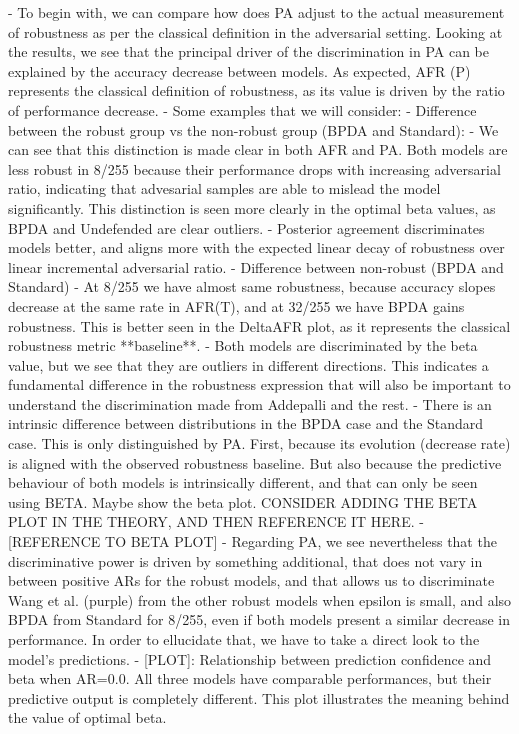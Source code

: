 - To begin with, we can compare how does PA adjust to the actual measurement of robustness as per the classical definition in the adversarial setting. Looking at the results, we see that the principal driver of the discrimination in PA can be explained by the accuracy decrease between models. As expected, AFR (P) represents the classical definition of robustness, as its value is driven by the ratio of performance decrease.
- Some examples that we will consider:
    - Difference between the robust group vs the non-robust group (BPDA and Standard):
        - We can see that this distinction is made clear in both AFR and PA. Both models are less robust in 8/255 because their performance drops with increasing adversarial ratio, indicating that advesarial samples are able to mislead the model significantly. This distinction is seen more clearly in the optimal beta values, as BPDA and Undefended are clear outliers.
        - Posterior agreement discriminates models better, and aligns more with the expected linear decay of robustness over linear incremental adversarial ratio.
    - Difference between non-robust (BPDA and Standard)
        - At 8/255 we have almost same robustness, because accuracy slopes decrease at the same rate in AFR(T), and at 32/255 we have BPDA gains robustness. This is better seen in the DeltaAFR plot, as it represents the classical robustness metric **baseline**.
        - Both models are discriminated by the beta value, but we see that they are outliers in different directions. This indicates a fundamental difference in the robustness expression that will also be important to understand the discrimination made from Addepalli and the rest.
        - There is an intrinsic difference between distributions in the BPDA case and the Standard case. This is only distinguished by PA. First, because its evolution (decrease rate) is aligned with the observed robustness baseline. But also because the predictive behaviour of both models is intrinsically different, and that can only be seen using BETA. Maybe show the beta plot. CONSIDER ADDING THE BETA PLOT IN THE THEORY, AND THEN REFERENCE IT HERE.
            - [REFERENCE TO BETA PLOT]
- Regarding PA, we see nevertheless that the discriminative power is driven by something additional, that does not vary in between positive ARs for the robust models, and that allows us to discriminate Wang et al. (purple) from the other robust models when epsilon is small, and also BPDA from Standard for 8/255, even if both models present a similar decrease in performance.  In order to ellucidate that, we have to take a direct look to the model’s predictions.
    - [PLOT]: Relationship between prediction confidence and beta when AR=0.0. All three models have comparable performances, but their predictive output is completely different. This plot illustrates the meaning behind the value of optimal beta.


